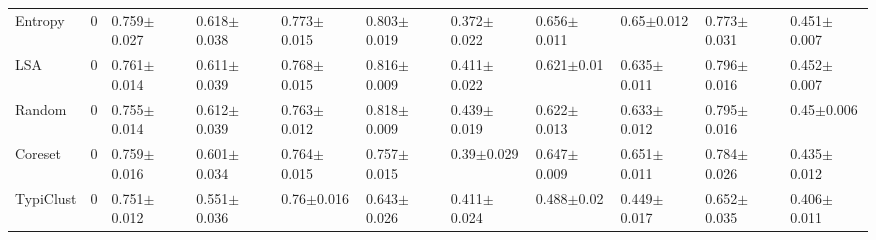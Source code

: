 \documentclass[]{article}
\begin{document}
\begin{table}[H]
{\begin{tabular}{l|llllllllll}
			Entropy & 0 & 0.759$\pm${\small0.027} & 0.618$\pm${\small0.038} & 0.773$\pm${\small0.015} & 0.803$\pm${\small0.019} & 0.372$\pm${\small0.022} & 0.656$\pm${\small0.011} & 0.65$\pm${\small0.012} & 0.773$\pm${\small0.031} & 0.451$\pm${\small0.007} \\
			LSA & 0 & 0.761$\pm${\small0.014} & 0.611$\pm${\small0.039} & 0.768$\pm${\small0.015} & 0.816$\pm${\small0.009} & 0.411$\pm${\small0.022} & 0.621$\pm${\small0.01} & 0.635$\pm${\small0.011} & 0.796$\pm${\small0.016} & 0.452$\pm${\small0.007} \\
			Random & 0 & 0.755$\pm${\small0.014} & 0.612$\pm${\small0.039} & 0.763$\pm${\small0.012} & 0.818$\pm${\small0.009} & 0.439$\pm${\small0.019} & 0.622$\pm${\small0.013} & 0.633$\pm${\small0.012} & 0.795$\pm${\small0.016} & 0.45$\pm${\small0.006} \\
			Coreset & 0 & 0.759$\pm${\small0.016} & 0.601$\pm${\small0.034} & 0.764$\pm${\small0.015} & 0.757$\pm${\small0.015} & 0.39$\pm${\small0.029} & 0.647$\pm${\small0.009} & 0.651$\pm${\small0.011} & 0.784$\pm${\small0.026} & 0.435$\pm${\small0.012} \\
			TypiClust & 0 & 0.751$\pm${\small0.012} & 0.551$\pm${\small0.036} & 0.76$\pm${\small0.016} & 0.643$\pm${\small0.026} & 0.411$\pm${\small0.024} & 0.488$\pm${\small0.02} & 0.449$\pm${\small0.017} & 0.652$\pm${\small0.035} & 0.406$\pm${\small0.011}
		\end{tabular}
	}
\end{table}
\end{document}
